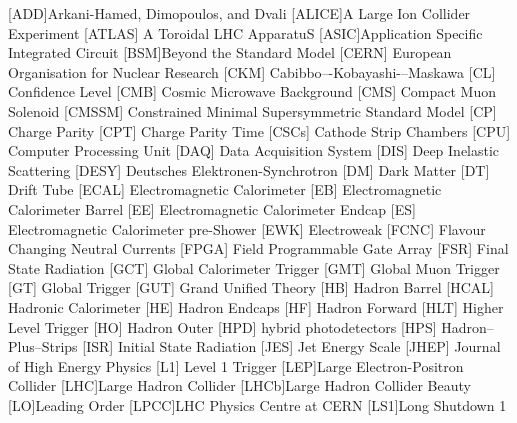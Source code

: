 \begin{acronym}[AAAAAAA]
[ADD]{Arkani-Hamed, Dimopoulos, and Dvali}
[ALICE]{A Large Ion Collider Experiment}
 [ATLAS] {A Toroidal LHC ApparatuS}
[ASIC]{Application Specific Integrated Circuit}
[BSM]{Beyond the Standard Model}
 [CERN] {European Organisation for Nuclear Research}
 [CKM] {Cabibbo–-Kobayashi-–Maskawa}
 [CL] {Confidence Level}
 [CMB] {Cosmic Microwave Background}
 [CMS] {Compact Muon Solenoid}
 [CMSSM] {Constrained Minimal Supersymmetric Standard Model}
 [CP] {Charge Parity}
 [CPT] {Charge Parity Time}
 [CSCs] {Cathode Strip Chambers}
 [CPU] {Computer Processing Unit}
 [DAQ] {Data Acquisition System}
 [DIS] {Deep Inelastic Scattering}
 [DESY] {Deutsches Elektronen-Synchrotron}
 [DM] {Dark Matter}
 [DT] {Drift Tube}
 [ECAL] {Electromagnetic Calorimeter}
 [EB] {Electromagnetic Calorimeter Barrel}
 [EE] {Electromagnetic Calorimeter Endcap}
 [ES] {Electromagnetic Calorimeter pre-Shower}
 [EWK] {Electroweak}
 [FCNC] {Flavour Changing Neutral Currents}
 [FPGA] {Field Programmable Gate Array}
 [FSR] {Final State Radiation}
 [GCT] {Global Calorimeter Trigger}
 [GMT] {Global Muon Trigger}
 [GT] {Global Trigger}
 [GUT] {Grand Unified Theory}
 [HB] {Hadron Barrel}
 [HCAL] {Hadronic Calorimeter}
 [HE] {Hadron Endcaps}
 [HF] {Hadron Forward}
[HLT] {Higher Level Trigger}
 [HO] {Hadron Outer}
 [HPD] {hybrid photodetectors}
 [HPS] {Hadron--Plus--Strips}
 [ISR] {Initial State Radiation}
 [JES] {Jet Energy Scale}
 [JHEP] {Journal of High Energy Physics}
 [L1] {Level 1 Trigger}
[LEP]{Large Electron-Positron Collider}
[LHC]{Large Hadron Collider}
[LHCb]{Large Hadron Collider Beauty}
[LO]{Leading Order}
[LPCC]{LHC Physics Centre at CERN}
[LS1]{Long Shutdown 1}

\end{acronym}
